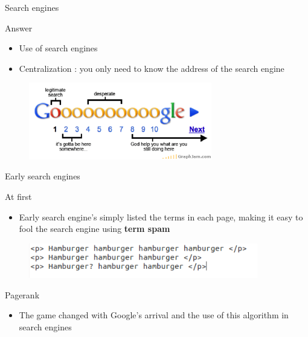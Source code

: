 \documentclass[10pt]{beamer}
\begin{document}
\begin{frame}{Search engines}
\begin{block}{Answer}
\begin{itemize}
\item Use of search engines
\item Centralization : you only need to know the address of the search engine
\end{itemize}
\end{block}
\begin{figure}
\centering
	\includegraphics[width = 8cm]{google-search-result-pages.png}
\end{figure}

\end{frame}
\begin{frame}{Early search engines}
\begin{block}{At first}
\begin{itemize}
\item Early search engine's simply listed the terms in each page, making it easy to fool the search engine using \textbf{term spam}

\end{itemize}
\end{block}
\begin{figure}
	\includegraphics[width = 10cm]{termspam.png}
\end{figure}
\begin{block}{Pagerank}
\begin{itemize}
\item The game changed with Google's arrival and the use of this algorithm in search engines
\end{itemize}
\end{block}
\end{frame}
\end{document}
